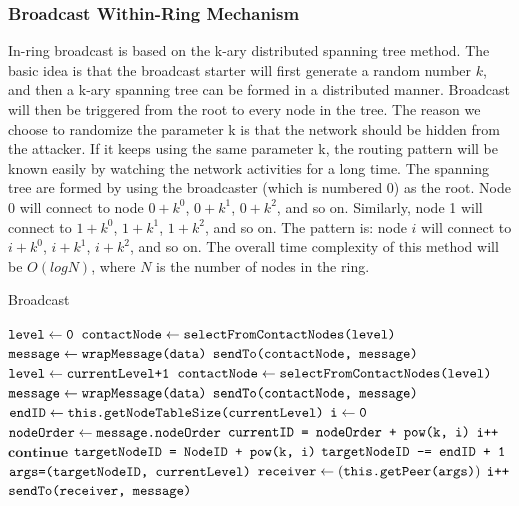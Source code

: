 \subsubsection{Broadcast Within-Ring Mechanism}

In-ring broadcast is based on the k-ary distributed spanning tree method. The basic idea is that the broadcast starter will first generate a random number $k$, and then a k-ary spanning tree can be formed in a distributed manner. Broadcast will then be triggered from the root to every node in the tree. The reason we choose to randomize the parameter k is that the network should be hidden from the attacker. If it keeps using the same parameter k, the routing pattern will be known easily by watching the network activities for a long time. The spanning tree are formed by using the broadcaster (which is numbered 0) as the root. Node 0 will connect to node $0+k^0$, $0+k^1$, $0+k^2$, and so on. Similarly, node 1 will connect to $1+k^0$, $1+k^1$, $1+k^2$, and so on. The pattern is: node $i$ will connect to $i+k^0$, $i+k^1$, $i+k^2$, and so on. The overall time complexity of this method will be $O(logN)$, where $N$ is the number of nodes in the ring.

\begin{algorithm}[t]
	\caption{Broadcast}\label{euclid}
	\begin{algorithmic}[1]
		\State $\texttt{level} \gets \texttt{0}$
		\State $\texttt{contactNode} \gets \texttt{selectFromContactNodes(level)}$
		\State $\texttt{message} \gets \texttt{wrapMessage(data)}$
		\State $\texttt{sendTo(contactNode, message)}$
		\EndFunction
		\\
		\State $\texttt{level} \gets \texttt{currentLevel+1}$
		\State $\texttt{contactNode} \gets \texttt{selectFromContactNodes(level)}$
		\State $\texttt{message} \gets \texttt{wrapMessage(data)}$
		\State $\texttt{sendTo(contactNode, message)}$
		\EndFunction
		\\
		\State $\texttt{endID} \gets \texttt{this.getNodeTableSize(currentLevel)}$
		\State $\texttt{i} \gets \texttt{0}$
		\State $\texttt{nodeOrder} \gets \texttt{message.nodeOrder}$
		\State $\texttt{currentID = nodeOrder + pow(k, i)}$
			\State $\texttt{i++}$
			\State $\textbf{continue}$
			\Else
			\State $\texttt{targetNodeID = NodeID + pow(k, i)}$
			\State $\texttt{targetNodeID -= endID + 1}$
			\EndIf
			\State $\texttt{args=(targetNodeID, currentLevel)}$
			\State $\texttt{receiver} \gets (\texttt{this.getPeer(args)})$
			\State $\texttt{i++}$
			\State $\texttt{sendTo(receiver, message)}$
			\EndIf
		\EndWhile
		\EndFunction
	\end{algorithmic}
\end{algorithm}

